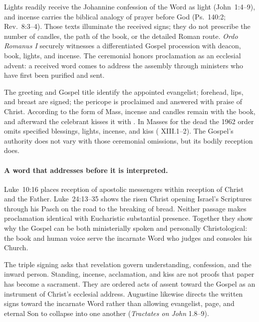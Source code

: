 Lights readily receive the Johannine confession of the Word as light (John~1:4--9), and incense carries the biblical analogy of prayer before God (Ps.~140:2; Rev.~8:3--4). Those texts illuminate the received signs; they do not prescribe the number of candles, the path of the book, or the detailed Roman route. \emph{Ordo Romanus I} securely witnesses a differentiated Gospel procession with deacon, book, lights, and incense. The ceremonial honors proclamation as an ecclesial advent: a received word comes to address the assembly through ministers who have first been purified and sent.


The greeting and Gospel title identify the appointed evangelist; forehead, lips, and breast are signed; the pericope is proclaimed and answered with praise of Christ. According to the form of Mass, incense and candles remain with the book, and afterward the celebrant kisses it with . In Masses for the dead the 1962 order omits specified blessings, lights, incense, and kiss ( XIII.1--2). The Gospel's authority does not vary with those ceremonial omissions, but its bodily reception does.

\paragraph{A word that addresses before it is interpreted.}
Luke~10:16 places reception of apostolic messengers within reception of Christ and the Father. Luke~24:13--35 shows the risen Christ opening Israel's Scriptures through his Pasch on the road to the breaking of bread. Neither passage makes proclamation identical with Eucharistic substantial presence. Together they show why the Gospel can be both ministerially spoken and personally Christological: the book and human voice serve the incarnate Word who judges and consoles his Church.

The triple signing asks that revelation govern understanding, confession, and the inward person. Standing, incense, acclamation, and kiss are not proofs that paper has become a sacrament. They are ordered acts of assent toward the Gospel as an instrument of Christ's ecclesial address. Augustine likewise directs the written signs toward the incarnate Word rather than allowing evangelist, page, and eternal Son to collapse into one another (\emph{Tractates on John} 1.8--9).

